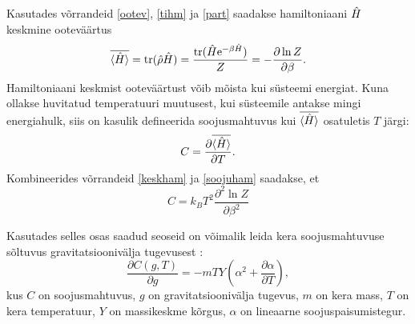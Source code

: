 \documentclass{trkut}%
\DeclareMathOperator{\tr}{tr}
\renewcommand\braket[1]{\langle{#1}\rangle}
\begin{document}
Kasutades võrrandeid \eqref{ootev}, \eqref{tihm} ja \eqref{part} saadakse hamiltoniaani $\op{H}$ keskmine ooteväärtus
\begin{equation}
    \overline{\braket{\op{H}}}=\tr(\op{\rho}\op{H})=\frac{\tr(\op{H}\mathrm{e}^{-\beta \op{H}})}{Z}= -\frac{\partial \ln Z}{\partial \beta}.
    \label{keskham}
\end{equation}
Hamiltoniaani keskmist ooteväärtust võib mõista kui süsteemi energiat. Kuna ollakse huvitatud temperatuuri muutusest, kui süsteemile antakse mingi energiahulk, siis on kasulik defineerida soojusmahtuvus kui $\overline{\braket{\op{H}}}$ osatuletis $T$ järgi:
\begin{equation}
    C = \frac{\partial \overline{\braket{\op{H}}}}{\partial T}.
    \label{soojuham}
\end{equation}
Kombineerides võrrandeid \eqref{keskham} ja \eqref{soojuham} saadakse, et
\begin{equation}
    C = k_B T^2 \frac{\partial^2 \ln Z}{\partial \beta^2}
    \label{mahtuvus}
\end{equation}

Kasutades selles osas saadud seoseid on võimalik leida kera soojusmahtuvuse sõltuvus gravitatsioonivälja tugevusest \parencite[10-13]{palma15}:
\begin{equation} \label{palmasor}
    \frac{\partial C(g,T)}{\partial g} = -mTY \left( \alpha^2 + \frac{\partial \alpha}{\partial T} \right),
\end{equation}
kus \(C\) on soojusmahtuvus, \(g\) on gravitatsioonivälja tugevus, \(m\) on kera mass, \(T\) on kera temperatuur, \(Y\) on massikeskme kõrgus, \(\alpha\) on lineaarne soojuspaisumistegur.
\end{document}
